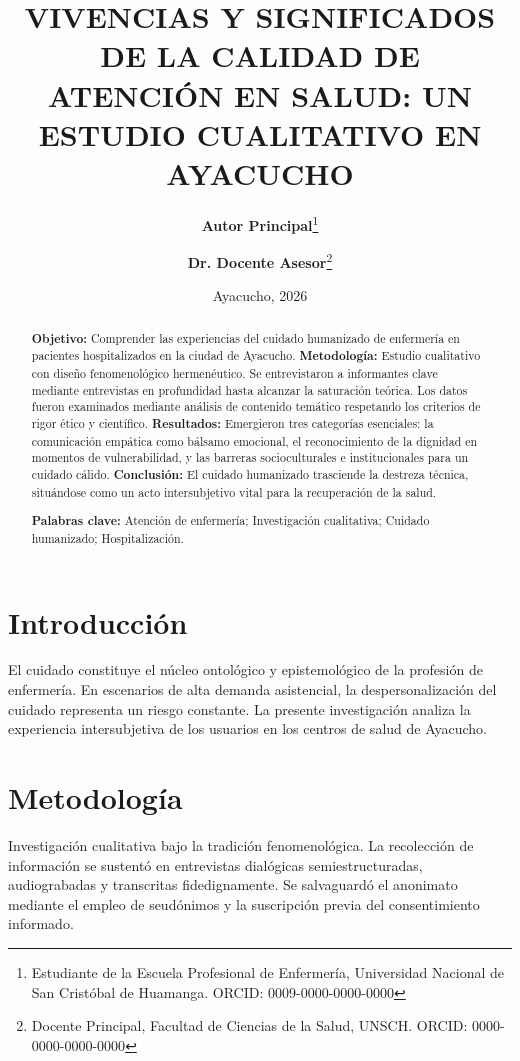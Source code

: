 \documentclass[11pt,a4paper]{article}
\title{\Large\bfseries VIVENCIAS Y SIGNIFICADOS DE LA CALIDAD DE ATENCIÓN EN SALUD: UN ESTUDIO CUALITATIVO EN AYACUCHO}
\author{
    \textbf{Autor Principal}\thanks{Estudiante de la Escuela Profesional de Enfermería, Universidad Nacional de San Cristóbal de Huamanga. ORCID: 0009-0000-0000-0000} \and
    \textbf{Dr. Docente Asesor}\thanks{Docente Principal, Facultad de Ciencias de la Salud, UNSCH. ORCID: 0000-0000-0000-0000}
}
\date{Ayacucho, 2026}
\begin{document}
\maketitle

\begin{abstract}
\noindent\textbf{Objetivo:} Comprender las experiencias del cuidado humanizado de enfermería en pacientes hospitalizados en la ciudad de Ayacucho. \textbf{Metodología:} Estudio cualitativo con diseño fenomenológico hermenéutico. Se entrevistaron a informantes clave mediante entrevistas en profundidad hasta alcanzar la saturación teórica. Los datos fueron examinados mediante análisis de contenido temático respetando los criterios de rigor ético y científico. \textbf{Resultados:} Emergieron tres categorías esenciales: la comunicación empática como bálsamo emocional, el reconocimiento de la dignidad en momentos de vulnerabilidad, y las barreras socioculturales e institucionales para un cuidado cálido. \textbf{Conclusión:} El cuidado humanizado trasciende la destreza técnica, situándose como un acto intersubjetivo vital para la recuperación de la salud.
\vspace{0.2cm}

\noindent\textbf{Palabras clave:} Atención de enfermería; Investigación cualitativa; Cuidado humanizado; Hospitalización.
\end{abstract}

\vspace{0.5cm}

\section{Introducción}
El cuidado constituye el núcleo ontológico y epistemológico de la profesión de enfermería. En escenarios de alta demanda asistencial, la despersonalización del cuidado representa un riesgo constante. La presente investigación analiza la experiencia intersubjetiva de los usuarios en los centros de salud de Ayacucho.

\section{Metodología}
Investigación cualitativa bajo la tradición fenomenológica. La recolección de información se sustentó en entrevistas dialógicas semiestructuradas, audiograbadas y transcritas fidedignamente. Se salvaguardó el anonimato mediante el empleo de seudónimos y la suscripción previa del consentimiento informado.
\end{document}
